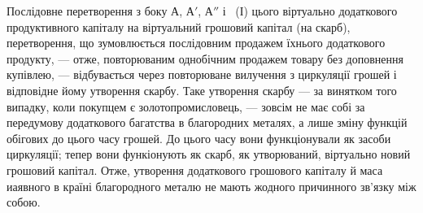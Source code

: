 Послідовне перетворення з боку $А$, $А'$, $А''$ і~ (І) цього віртуально
додаткового продуктивного капіталу на віртуальний грошовий
капітал (на скарб), перетворення, що зумовлюється послідовним продажем
їхнього додаткового продукту, — отже, повторюваним однобічним продажем
товару без доповнення купівлею, — відбувається через повторюване
вилучення з циркуляції грошей і відповідне йому утворення скарбу. Таке
утворення скарбу — за винятком того випадку, коли покупцем є золотопромисловець,
— зовсім не має собі за передумову додаткового багатства
в благородних металях, а лише зміну функцій обігових до цього часу
грошей. До цього часу вони функціонували як засоби циркуляції; тепер
вони функіонують як скарб, як утворюваний, віртуально новий грошовий
капітал. Отже, утворення додаткового грошового капіталу й маса
иаявного в країні благородного металю не мають жодного причинного
зв'язку між собою.
